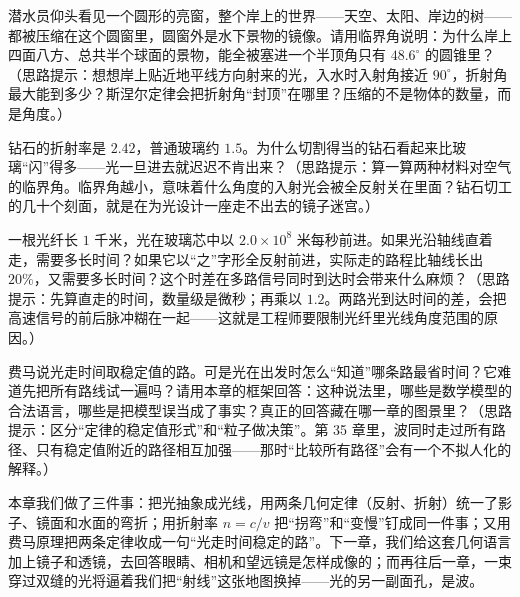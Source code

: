 \begin{puzzles}
\item 潜水员仰头看见一个圆形的亮窗，整个岸上的世界——天空、太阳、岸边的树——都被压缩在这个圆窗里，圆窗外是水下景物的镜像。请用临界角说明：为什么岸上四面八方、总共半个球面的景物，能全被塞进一个半顶角只有 \(48.6^\circ\) 的圆锥里？（思路提示：想想岸上贴近地平线方向射来的光，入水时入射角接近 \(90^\circ\)，折射角最大能到多少？斯涅尔定律会把折射角“封顶”在哪里？压缩的不是物体的数量，而是角度。）
\item 钻石的折射率是 \(2.42\)，普通玻璃约 \(1.5\)。为什么切割得当的钻石看起来比玻璃“闪”得多——光一旦进去就迟迟不肯出来？（思路提示：算一算两种材料对空气的临界角。临界角越小，意味着什么角度的入射光会被全反射关在里面？钻石切工的几十个刻面，就是在为光设计一座走不出去的镜子迷宫。）
\item 一根光纤长 \(1\) 千米，光在玻璃芯中以 \(2.0\times10^8\) 米每秒前进。如果光沿轴线直着走，需要多长时间？如果它以“之”字形全反射前进，实际走的路程比轴线长出 \(20\%\)，又需要多长时间？这个时差在多路信号同时到达时会带来什么麻烦？（思路提示：先算直走的时间，数量级是微秒；再乘以 \(1.2\)。两路光到达时间的差，会把高速信号的前后脉冲糊在一起——这就是工程师要限制光纤里光线角度范围的原因。）
\item 费马说光走时间取稳定值的路。可是光在出发时怎么“知道”哪条路最省时间？它难道先把所有路线试一遍吗？请用本章的框架回答：这种说法里，哪些是数学模型的合法语言，哪些是把模型误当成了事实？真正的回答藏在哪一章的图景里？（思路提示：区分“定律的稳定值形式”和“粒子做决策”。第 35 章里，波同时走过所有路径、只有稳定值附近的路径相互加强——那时“比较所有路径”会有一个不拟人化的解释。）
\end{puzzles}

\begin{mainline}
本章我们做了三件事：把光抽象成光线，用两条几何定律（反射、折射）统一了影子、镜面和水面的弯折；用折射率 \(n=c/v\) 把“拐弯”和“变慢”钉成同一件事；又用费马原理把两条定律收成一句“光走时间稳定的路”。下一章，我们给这套几何语言加上镜子和透镜，去回答眼睛、相机和望远镜是怎样成像的；而再往后一章，一束穿过双缝的光将逼着我们把“射线”这张地图换掉——光的另一副面孔，是波。
\end{mainline}
